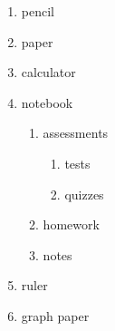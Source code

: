 \documentclass[11]{article}
\begin{document}
	\begin{enumerate} %
		\item pencil
		\item paper
		\item calculator
		\item notebook
			\begin{enumerate}
				\item assessments
					\begin{enumerate}
						\item tests
						\item quizzes
					\end{enumerate}
				\item homework
				\item notes
			\end{enumerate}
		\item ruler
		\item graph paper
	\end{enumerate}
\end{document}
